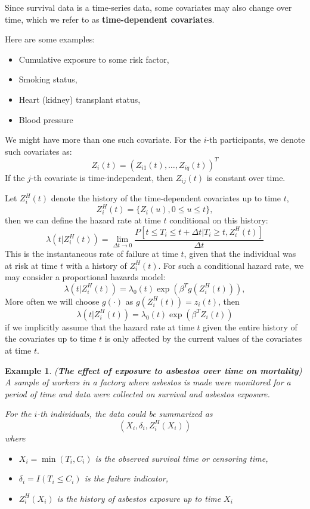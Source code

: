 \documentclass[11pt,addpoints,answers]{exam}
\newtheorem{example}{Example}
\begin{document}
\begin{CJK*}{UTF8}{gbsn}
Since survival data is a time-series data, some covariates may also change over time, 
which we refer to as \textbf{time-dependent covariates}.

Here are some examples:
\begin{itemize}
	\item Cumulative exposure to some risk factor,
	\item Smoking status,
	\item Heart (kidney) transplant status,
	\item Blood pressure
\end{itemize}

We might have more than one such covariate. For the $i$-th participants, we denote such 
covariates as:
$$
Z_i(t) = (Z_{i1}(t), \dots, Z_{iq}(t))^T
$$
If the $j$-th covariate is time-independent, then $Z_{ij}(t)$ is constant over time.

Let $Z_i^H(t)$ denote the history of the time-dependent covariates up to time $t$,
$$
Z_i^H(t) = \{Z_i(u), 0 \le u \le t\},
$$
then we can define the hazard rate at time $t$ conditional on this history:
$$
\lambda(t|Z_i^H(t)) = \lim_{\Delta t \to 0} \frac{P[t \le T_i \le t+\Delta t | T_i \ge t, Z_i^H(t)]}{\Delta t}
$$
This is the instantaneous rate of failure at time $t$, given that the individual was at 
risk at time $t$ with a history of $Z_i^H(t)$. For such a conditional hazard rate, we 
may consider a proportional hazards model:
$$
\lambda(t|Z_i^H(t)) = \lambda_0(t) \exp(\beta^T g(Z_i^H(t))),
$$
More often we will choose $g(\cdot)$ as $g(Z_i^H(t)) = z_i(t)$, then
$$
\lambda(t|Z_i^H(t)) = \lambda_0(t) \exp(\beta^T Z_i(t))
$$
if we implicitly assume that the hazard rate at time $t$ given the entire history of 
the covariates up to time $t$ is only affected by the current values of the covariates 
at time $t$.


\begin{example}{({\bf The effect of exposure to asbestos over time on mortality})}
A sample of workers in a factory where asbestos is made were monitored for a period of 
time and data were collected on survival and asbestos exposure.

For the $i$-th individuals, the data could be summarized as
$$
(X_i, \delta_i, Z_i^H(X_i))
$$
where
\begin{itemize}
	\item $X_i = \min(T_i, C_i)$ is the observed survival time or censoring time,
	\item $\delta_i = I(T_i \le C_i)$ is the failure indicator,
	\item $Z_i^H(X_i)$ is the history of asbestos exposure up to time $X_i$
\end{itemize}


\end{example}
\end{CJK*}
\end{document}
